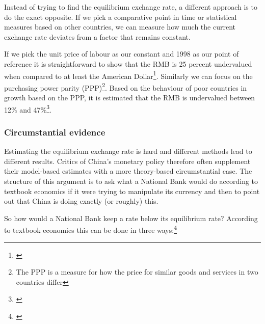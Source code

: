 \documentclass[11pt]{article}
\begin{document}
% 
Instead of trying to find the equilibrium exchange rate, a different 
approach is to do the exact opposite. If we pick a comparative point in 
time or statistical measures based on other countries, we can measure 
how much the current exchange rate deviates from a factor that remains 
constant.

If we pick the unit price of labour as our constant and 1998 as our 
point of reference it is straightforward to show that the RMB is 25 
percent undervalued when compared to at least the American 
Dollar\footnote{\cite{chimerica2009}}. Similarly we can focus on the 
purchasing power parity (PPP)\footnote{The PPP is a measure for how the 
price for similar goods and services in two countries differ}. Based on 
the behaviour of poor countries in growth based on the PPP, it is 
estimated that the RMB is undervalued between 12\% and 
47\%\footnote{\cite{Subramanian2010}}.



\subsubsection{Circumstantial evidence}

Estimating the equilibrium exchange rate is hard and different methods lead to different results. Critics of China's monetary policy therefore often supplement their model-based estimates with a more theory-based circumstantial case. The structure of this argument is to ask what a National Bank would do according to textbook economics if it were trying to manipulate its currency and then to point out that China is doing exactly (or roughly) this. 


So how would a National Bank keep a rate below its equilibrium rate? According to 
textbook economics this can be done in three ways:\footnote{\cite[pp. 
514]{Krugman2008}}
\end{document}
